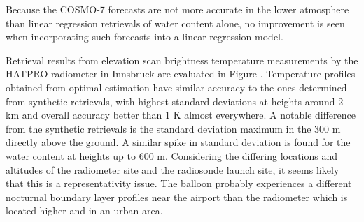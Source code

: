     Because the COSMO-7 forecasts are not more accurate in the lower atmosphere
    than linear regression retrievals of water content alone, no improvement
    is seen when incorporating such forecasts into a linear regression model.

        {}

\stopsubsection

\startsubsection[title={Retrievals with Real Radiometer Data},reference=ch:hatproeval]

    Retrieval results from elevation scan brightness temperature measurements
    by the HATPRO radiometer in Innsbruck are evaluated in Figure
    . Temperature profiles obtained from optimal estimation
    have similar accuracy to the ones determined from synthetic retrievals, with
    highest standard deviations at heights around 2 km and overall accuracy
    better than 1 K almost everywhere. A notable difference from the synthetic
    retrievals is the standard deviation maximum in the 300 m directly above the ground.
    A similar spike in standard deviation is found for the water content at
    heights up to 600 m. Considering the differing locations and altitudes of
    the radiometer site and the radiosonde launch site, it seems likely that
    this is a representativity issue. The balloon probably experiences
    a different nocturnal boundary layer profiles near the airport than the
    radiometer which is located higher and in an urban area.

